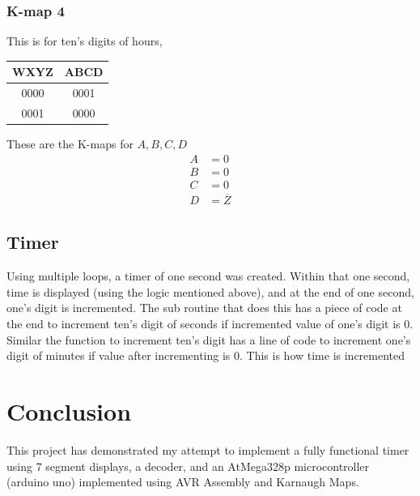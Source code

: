 \documentclass[a4paper,12pt]{article}
\begin{document}
\subsubsection*{K-map 4}
This is for ten's digits of hours, \newline \newline
\begin{tabular}{|c|c|}
\hline
WXYZ & ABCD \\
\hline
0000 & 0001 \\
0001 & 0000 \\
\hline
\end{tabular}
\newline
\newline These are the K-maps for $A, B, C, D$
\begin{align*}
A &= 0 \\
B &= 0 \\
C &= 0 \\
D &= \overline{Z}
\end{align*}
\subsection*{Timer}
Using multiple loops, a timer of one second was created. Within that one second, time is displayed (using the logic mentioned above), and at the end of one second, one's digit is incremented. The sub routine that does this has a piece of code at the end to increment ten's digit of seconds if incremented value of one's digit is 0. Similar the function to increment ten's digit has a line of code to increment one's digit of minutes if value after incrementing is 0. This is how time is incremented

\section*{Conclusion}
This project has demonstrated my attempt to implement a fully functional timer using 7 segment displays, a decoder, and an AtMega328p microcontroller (arduino uno) implemented using AVR Assembly and Karnaugh Maps. 
\end{document}
